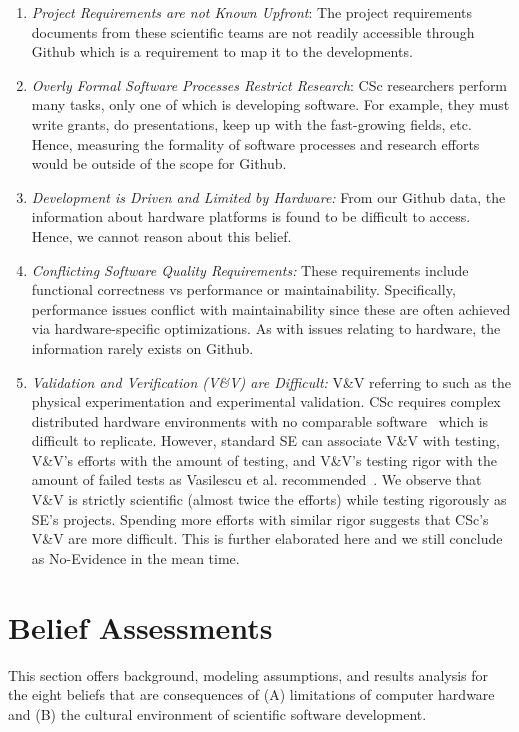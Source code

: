 \documentclass[conference,10pt]{IEEEtran}
\newcommand{\be}{\begin{enumerate}}
\newcommand{\ee}{\end{enumerate}}
\begin{document}
\be
\item {\em Project Requirements are not Known Upfront}: The project requirements documents from these scientific teams are not readily accessible through Github which is a requirement to map it to the developments.   
\item {\em Overly Formal Software Processes Restrict Research}: CSc researchers perform many tasks,
only one of which is developing software. For example,
they must write grants, do presentations, keep up with the fast-growing fields, etc. Hence, measuring the formality of software processes and research efforts would be outside of the scope for Github.
\item {\em Development is Driven and Limited by Hardware:}
From our Github data, the information about hardware platforms is found to be difficult to access. Hence, we cannot reason about this belief.
\item {\em Conflicting Software Quality Requirements:} These requirements include functional correctness vs
performance or maintainability. Specifically, performance issues conflict with maintainability since these are often achieved via hardware-specific optimizations. As with issues
relating to hardware,
the information rarely exists on Github. 
\item {\em Validation and Verification (V\&V) are Difficult:}  V\&V referring to such as the physical experimentation and experimental validation. CSc requires complex distributed hardware environments  with no comparable software~\cite{basili08_hpc} which is difficult to replicate. However, standard SE can associate V\&V with testing, V\&V's efforts with the amount of testing, and V\&V's testing rigor with the amount of failed tests as Vasilescu et al. recommended~\cite{vasilescu16_limit}. We observe that V\&V is strictly scientific (almost twice the efforts) while testing rigorously as SE's projects. Spending more efforts with similar rigor suggests that CSc's V\&V are more difficult. This is further elaborated here and we still conclude as No-Evidence in the mean time.

\ee






\section{Belief Assessments}\label{tion:result}

This section offers background, modeling assumptions, and results analysis for the eight beliefs that are consequences of (A) limitations of computer hardware  and (B) the cultural environment of scientific software development.
\end{document}
